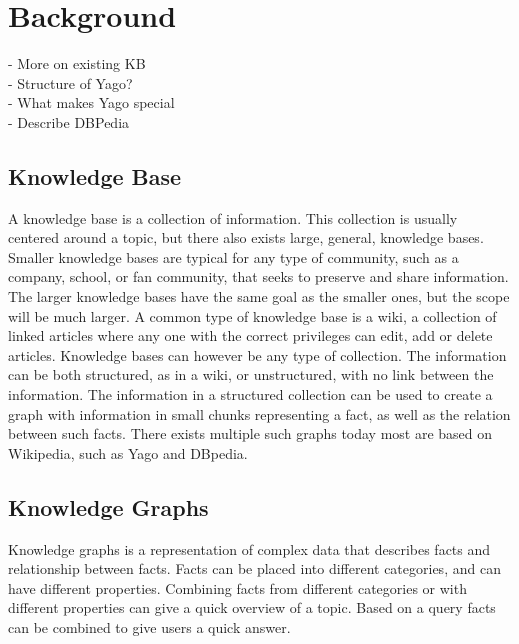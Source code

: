 
\chapter{Background}

- More on existing KB\\
- Structure of Yago?\\
- What makes Yago special\\
- Describe DBPedia\\

\section{Knowledge Base}
A knowledge base is a collection of information. This collection is usually centered around a topic, but there also exists large, general, knowledge bases. Smaller knowledge bases are typical for any type of community, such as a company, school, or fan community, that seeks to preserve and share information. The larger knowledge bases have the same goal as the smaller ones, but the scope will be much larger. A common type of knowledge base is a wiki, a collection of linked articles where any one with the correct privileges can edit, add or delete articles. Knowledge bases can however be any type of collection. The information can be both structured, as in a wiki, or unstructured, with no link between the information. The information in a structured collection can be used to create a graph with information in small chunks representing a fact, as well as the relation between such facts. There exists multiple such graphs today most are based on Wikipedia, such as Yago\cite{yago} and DBpedia\cite{dbpedia}.\\

\section{Knowledge Graphs}
Knowledge graphs is a representation of complex data that describes facts and relationship between facts. Facts can be placed into different categories, and can have different properties. Combining facts from different categories or with different properties can give a quick overview of a topic. Based on a query facts can be combined to give users a quick answer.\\

